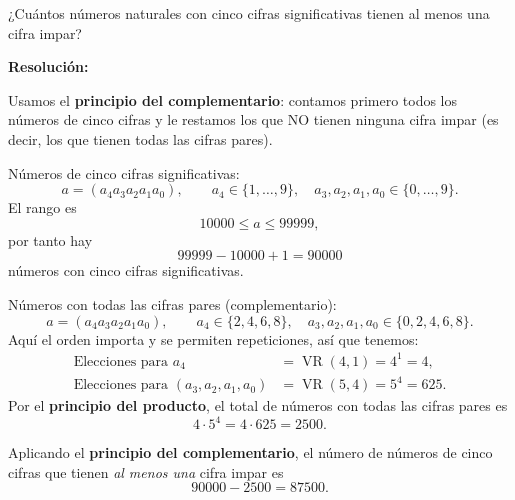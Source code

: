 \documentclass[a4paper,12pt]{article}
\begin{document}
\begin{ejercicio}[title=Ejercicio 11]
¿Cuántos números naturales con cinco cifras significativas tienen al menos una cifra impar?

\tcblower
\textbf{Resolución:}

Usamos el \textbf{principio del complementario}: contamos primero todos los números de cinco cifras y le restamos los que NO tienen ninguna cifra impar (es decir, los que tienen todas las cifras pares).

\medskip

Números de cinco cifras significativas:
\[
a = (a_4a_3a_2a_1a_0),\qquad a_4\in\{1,\dots,9\},\quad a_3,a_2,a_1,a_0\in\{0,\dots,9\}.
\]
El rango es
\[
10000\le a \le 99999,
\]
por tanto hay
\[
99999-10000+1 = 90000
\]
números con cinco cifras significativas.

\medskip

Números con todas las cifras pares (complementario):
\[
a = (a_4a_3a_2a_1a_0),\qquad a_4\in\{2,4,6,8\},\quad a_3,a_2,a_1,a_0\in\{0,2,4,6,8\}.
\]
Aquí el orden importa y se permiten repeticiones, así que tenemos:
\[
\begin{aligned}
    \text{Elecciones para } a_4 &= \operatorname{VR}(4,1) = 4^1 = 4, \\
    \text{Elecciones para } (a_3, a_2, a_1, a_0) &= \operatorname{VR}(5,4) = 5^4 = 625.
\end{aligned}
\]
Por el \textbf{principio del producto}, el total de números con todas las cifras pares es
\[
4\cdot 5^4 = 4\cdot 625 = 2500.
\]

\medskip

Aplicando el \textbf{principio del complementario}, el número de números de cinco cifras que tienen \emph{al menos una} cifra impar es
\[
90000 - 2500 = \boxed{87500}.
\]

\end{ejercicio}
\end{document}
